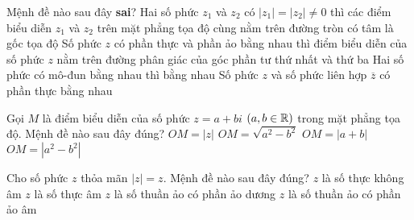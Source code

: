 \begin{ex}%
	Mệnh đề nào sau đây {\bf sai}?
	\choice
	{Hai số phức $z_1$ và $z_2$ có $\left|z_1\right|=\left|z_2\right|\neq 0$ thì các điểm biểu diễn $z_1$ và $z_2$ trên mặt phẳng tọa độ cùng nằm trên đường tròn có tâm là gốc tọa độ}
	{Số phức $z$ có phần thực và phần ảo bằng nhau thì điểm biểu diễn của số phức $z$ nằm trên đường phân giác của góc phần tư thứ nhất và thứ ba}
	{\True Hai số phức có mô-đun bằng nhau thì bằng nhau}
	{Số phức $z$ và số phức liên hợp $\overline{z}$ có phần thực bằng nhau}
\end{ex}

\begin{ex}%
	Gọi $M$ là điểm biểu diễn của số phức $z=a+bi$ $\left(a, b\in \Bbb{R}\right)$ trong mặt phẳng tọa độ. Mệnh đề nào sau đây đúng?
	\choice
	{\True $OM=|z|$}
	{$OM=\sqrt{a^2-b^2}$}
	{$OM=|a+b|$}
	{$OM=|a^2-b^2|$}
\end{ex}

\begin{ex}%
	Cho số phức $z$ thỏa mãn $|z|=z.$ Mệnh đề nào sau đây đúng?
	\choice
	{\True $z$ là số thực không âm}
	{$z$ là số thực âm}
	{$z$ là số thuần ảo có phần ảo dương}
	{$z$ là số thuần ảo có phần ảo âm}
\end{ex}

